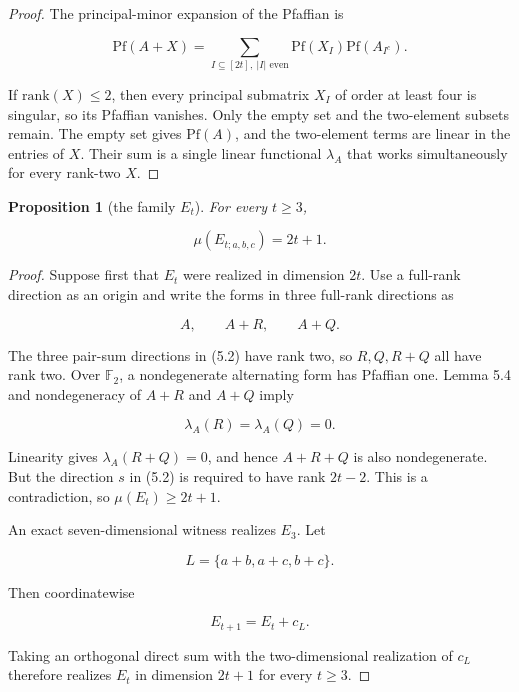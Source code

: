 \documentclass[11pt]{article}
\newtheorem{proposition}[theorem]{Proposition}
\theoremstyle{remark}
\numberwithin{equation}{section}
\begin{document}
\begin{proof}

The principal-minor expansion of the Pfaffian is

\nopagebreak[4]
\[
\mathrm{Pf}(A+X)
=\sum_{I\subseteq[2t],\ |I|\text{ even}}
 \mathrm{Pf}(X_I)\mathrm{Pf}(A_{I^c}).
\tag{5.5}
\]

If $\mathrm{rank}(X)\le2$, then every principal submatrix $X_I$ of order at
least four is singular, so its Pfaffian vanishes. Only the empty set and the
two-element subsets remain. The empty set gives $\mathrm{Pf}(A)$, and the
two-element terms are linear in the entries of $X$. Their sum is a single
linear functional $\lambda_A$ that works simultaneously for every rank-two
$X$.
\end{proof}


\Needspace{0.28\textheight}
\begin{proposition}[the family $E_t$]

For every $t\ge3$,

\nopagebreak[4]
\[
\mu(E_{t;a,b,c})=2t+1.
\tag{5.6}
\]

\end{proposition}

\begin{proof}

Suppose first that $E_t$ were realized in dimension $2t$. Use a full-rank
direction as an origin and write the forms in three full-rank directions as

\nopagebreak[4]
\[
A,\qquad A+R,\qquad A+Q.
\]

The three pair-sum directions in (5.2) have rank two, so
$R,Q,R+Q$ all have rank two. Over $\mathbb F_2$, a nondegenerate alternating
form has Pfaffian one. Lemma 5.4 and nondegeneracy of $A+R$ and $A+Q$ imply

\nopagebreak[4]
\[
\lambda_A(R)=\lambda_A(Q)=0.
\]

Linearity gives $\lambda_A(R+Q)=0$, and hence $A+R+Q$ is also nondegenerate.
But the direction $s$ in (5.2) is required to have rank $2t-2$. This is a
contradiction, so $\mu(E_t)\ge2t+1$.

An exact seven-dimensional witness realizes $E_3$. Let

\nopagebreak[4]
\[
L=\{a+b,a+c,b+c\}.
\]

Then coordinatewise

\nopagebreak[4]
\[
E_{t+1}=E_t+c_L.
\tag{5.7}
\]

Taking an orthogonal direct sum with the two-dimensional realization of $c_L$
therefore realizes $E_t$ in dimension $2t+1$ for every $t\ge3$.
\end{proof}
\end{document}
